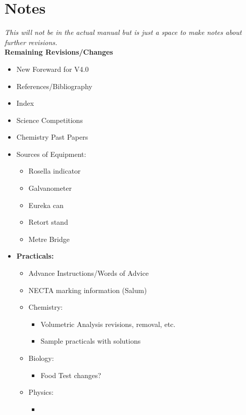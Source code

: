 \chapter{Notes}

\emph{This will not be in the actual manual but is just a space to make notes about further revisions.}\\[10pt]

\textbf{Remaining Revisions\slash Changes}

\begin{itemize}
\item New Foreward for V4.0
\item References\slash Bibliography
\item Index
\item Science Competitions 
\item Chemistry Past Papers
\item Sources of Equipment:
\begin{itemize}
\item Rosella indicator
\item Galvanometer
\item Eureka can
\item Retort stand
\item Metre Bridge
\end{itemize}

\item \textbf{Practicals:}
\begin{itemize}
\item Advance Instructions\slash Words of Advice
\item NECTA marking information (Salum)
\item Chemistry:
\begin{itemize}
\item Volumetric Analysis revisions, removal, etc.
\item Sample practicals with solutions
\end{itemize}
\item Biology:
\begin{itemize}
\item Food Test changes?
\end{itemize}
\item Physics:
\begin{itemize}
\item
\end{itemize}
\end{itemize}


\end{itemize}
